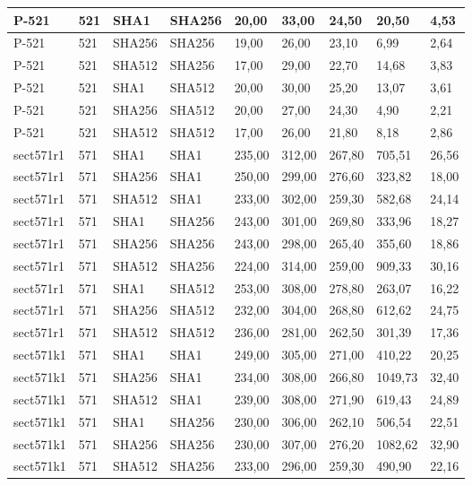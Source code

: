 \begin{longtable}{| l | l | l | l | l |l |l |l |l |}
P-521 & 521 & SHA1 & SHA256 & 20,00 & 33,00 & 24,50 & 20,50 & 4,53 \\ \hline 
P-521 & 521 & SHA256 & SHA256 & 19,00 & 26,00 & 23,10 & 6,99 & 2,64 \\ \hline 
P-521 & 521 & SHA512 & SHA256 & 17,00 & 29,00 & 22,70 & 14,68 & 3,83 \\ \hline 
P-521 & 521 & SHA1 & SHA512 & 20,00 & 30,00 & 25,20 & 13,07 & 3,61 \\ \hline 
P-521 & 521 & SHA256 & SHA512 & 20,00 & 27,00 & 24,30 & 4,90 & 2,21 \\ \hline 
P-521 & 521 & SHA512 & SHA512 & 17,00 & 26,00 & 21,80 & 8,18 & 2,86 \\ \hline 
sect571r1 & 571 & SHA1 & SHA1 & 235,00 & 312,00 & 267,80 & 705,51 & 26,56 \\ \hline 
sect571r1 & 571 & SHA256 & SHA1 & 250,00 & 299,00 & 276,60 & 323,82 & 18,00 \\ \hline 
sect571r1 & 571 & SHA512 & SHA1 & 233,00 & 302,00 & 259,30 & 582,68 & 24,14 \\ \hline 
sect571r1 & 571 & SHA1 & SHA256 & 243,00 & 301,00 & 269,80 & 333,96 & 18,27 \\ \hline 
sect571r1 & 571 & SHA256 & SHA256 & 243,00 & 298,00 & 265,40 & 355,60 & 18,86 \\ \hline 
sect571r1 & 571 & SHA512 & SHA256 & 224,00 & 314,00 & 259,00 & 909,33 & 30,16 \\ \hline 
sect571r1 & 571 & SHA1 & SHA512 & 253,00 & 308,00 & 278,80 & 263,07 & 16,22 \\ \hline 
sect571r1 & 571 & SHA256 & SHA512 & 232,00 & 304,00 & 268,80 & 612,62 & 24,75 \\ \hline 
sect571r1 & 571 & SHA512 & SHA512 & 236,00 & 281,00 & 262,50 & 301,39 & 17,36 \\ \hline 
sect571k1 & 571 & SHA1 & SHA1 & 249,00 & 305,00 & 271,00 & 410,22 & 20,25 \\ \hline 
sect571k1 & 571 & SHA256 & SHA1 & 234,00 & 308,00 & 266,80 & 1049,73 & 32,40 \\ \hline 
sect571k1 & 571 & SHA512 & SHA1 & 239,00 & 308,00 & 271,90 & 619,43 & 24,89 \\ \hline 
sect571k1 & 571 & SHA1 & SHA256 & 230,00 & 306,00 & 262,10 & 506,54 & 22,51 \\ \hline 
sect571k1 & 571 & SHA256 & SHA256 & 230,00 & 307,00 & 276,20 & 1082,62 & 32,90 \\ \hline 
sect571k1 & 571 & SHA512 & SHA256 & 233,00 & 296,00 & 259,30 & 490,90 & 22,16 \\ \hline 

\end{longtable}
